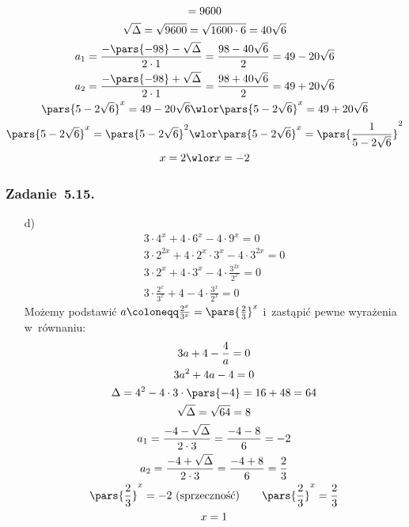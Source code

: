 \begin{itemize}
\begin{gather*}
                = 9600\\
            \sqrt{\Delta}
                = \sqrt{9600}
                = \sqrt{1600 \cdot 6}
                = 40\sqrt{6}\\
            a_1
                = \frac{-\pars{-98} - \sqrt{\Delta}}{2 \cdot 1}
                = \frac{98 - 40\sqrt{6}}{2}
                = 49 - 20\sqrt{6}\\
            a_2
                = \frac{-\pars{-98} + \sqrt{\Delta}}{2 \cdot 1}
                = \frac{98 + 40\sqrt{6}}{2}
                = 49 + 20\sqrt{6}\\
            \pars{5 - 2\sqrt{6}}^x = 49 - 20\sqrt{6} \wlor \pars{5 - 2\sqrt{6}}^x = 49 + 20\sqrt{6}\\
            \pars{5 - 2\sqrt{6}}^x = \pars{5 - 2\sqrt{6}}^2 \wlor \pars{5 - 2\sqrt{6}}^x = \pars{\frac{1}{5 - 2\sqrt{6}}}^2\\
            x = 2 \wlor x = -2
        \end{gather*}
\end{itemize}
\subsubsection*{Zadanie~5.15.}
\begin{itemize}
    \item[d)]
        \begin{gather*}
            3 \cdot 4^x + 4 \cdot 6^x - 4 \cdot 9^x = 0\\
            3 \cdot 2^{2x} + 4 \cdot 2^x \cdot 3^x - 4 \cdot 3^{2x} = 0\\
            3 \cdot 2^x + 4 \cdot 3^x - 4 \cdot \frac{3^{2x}}{2^x} = 0\\
            3 \cdot \frac{2^x}{3^x} + 4 - 4 \cdot \frac{3^x}{2^x} = 0
        \end{gather*}
        Możemy podstawić \(a \coloneqq \frac{2^x}{3^x} = \pars{\frac{2}{3}}^x\) i~zastąpić pewne wyrażenia w~równaniu:
        \begin{gather*}
            3a + 4 - \frac{4}{a} = 0\\
            3a^2 + 4a - 4 = 0\\
            \Delta
                = 4^2 - 4 \cdot 3 \cdot \pars{-4}
                = 16 + 48
                = 64\\
            \sqrt{\Delta}
                = \sqrt{64}
                = 8\\
            a_1
                = \frac{-4 - \sqrt{\Delta}}{2 \cdot 3}
                = \frac{-4 - 8}{6}
                = -2\\
            a_2
                = \frac{-4 + \sqrt{\Delta}}{2 \cdot 3}
                = \frac{-4 + 8}{6}
                = \frac{2}{3}\\
            \pars{\frac{2}{3}}^x = -2 \text{ (sprzeczność)} \qquad \pars{\frac{2}{3}}^x = \frac{2}{3}\\
            x = 1
        \end{gather*}
\end{itemize}
